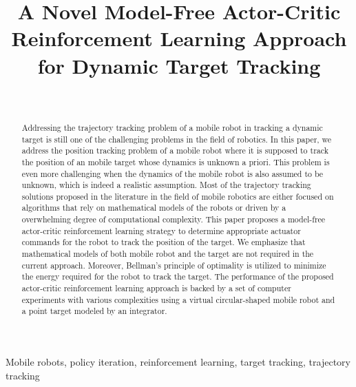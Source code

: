 \documentclass[conference]{IEEEtran}
\begin{document}
\title{A Novel Model-Free Actor-Critic  Reinforcement Learning Approach for Dynamic Target Tracking  
%  
}

\author{%
  ~ %
}

\maketitle

\begin{abstract}
  Addressing the trajectory tracking problem of a mobile robot in tracking a
  dynamic target is still one of the challenging problems in the field of
  robotics. In this paper, we address the position tracking problem of a mobile
  robot where it is supposed to track the position of an mobile target whose
  dynamics is unknown a priori. This problem is even more challenging when the
  dynamics of the mobile robot is also assumed to be unknown, which is indeed a
  realistic assumption. Most of the trajectory tracking solutions proposed in the
  literature in the field of mobile robotics are either focused on algorithms
  that rely on mathematical models of the robots or driven by a overwhelming
  degree of computational complexity. This paper proposes a model-free
  actor-critic reinforcement learning strategy to determine appropriate actuator
  commands for the robot to track the position of the target. We emphasize that
  mathematical models of both mobile robot and the target are not required in
  the current approach. Moreover, Bellman's principle of optimality is utilized
  to minimize the energy required for the robot to track the target. The
  performance of the proposed actor-critic reinforcement learning approach is
  backed by a set of computer experiments with various complexities using a
  virtual circular-shaped mobile robot and a point target modeled by an
  integrator.
%
\end{abstract}

\begin{IEEEkeywords}
  Mobile robots, policy iteration, reinforcement learning, target tracking, trajectory tracking
\end{IEEEkeywords}
\end{document}

